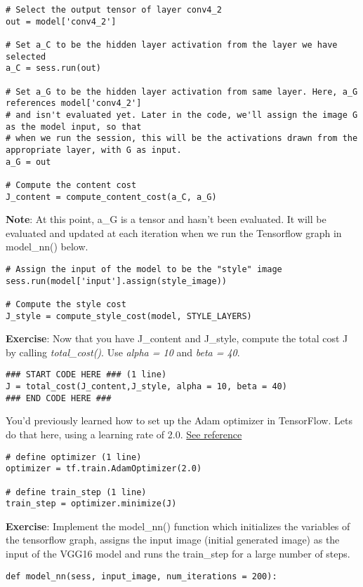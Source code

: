 {\begin{verbatim}
# Select the output tensor of layer conv4_2
out = model['conv4_2']

# Set a_C to be the hidden layer activation from the layer we have selected
a_C = sess.run(out)

# Set a_G to be the hidden layer activation from same layer. Here, a_G references model['conv4_2'] 
# and isn't evaluated yet. Later in the code, we'll assign the image G as the model input, so that
# when we run the session, this will be the activations drawn from the appropriate layer, with G as input.
a_G = out

# Compute the content cost
J_content = compute_content_cost(a_C, a_G)
\end{verbatim}


{\textbf{Note}}: At this point, a\_G is a tensor and hasn't been evaluated. It will be evaluated and updated at each iteration when we run the Tensorflow graph in model\_nn() below.
\begin{verbatim}
# Assign the input of the model to be the "style" image 
sess.run(model['input'].assign(style_image))

# Compute the style cost
J_style = compute_style_cost(model, STYLE_LAYERS)
\end{verbatim}


{\textbf{Exercise}}: Now that you have J\_content and J\_style, compute the total cost J by calling \emph{total\_cost()}. Use \emph{alpha = 10} and \emph{beta = 40}.
\begin{verbatim}
### START CODE HERE ### (1 line)
J = total_cost(J_content,J_style, alpha = 10, beta = 40)
### END CODE HERE ###
\end{verbatim}


You'd previously learned how to set up the Adam optimizer in TensorFlow. Lets do that here, using a learning rate of 2.0.  \href{https://www.tensorflow.org/api_docs/python/tf/train/AdamOptimizer}{See reference}
\begin{verbatim}
# define optimizer (1 line)
optimizer = tf.train.AdamOptimizer(2.0)

# define train_step (1 line)
train_step = optimizer.minimize(J)
\end{verbatim}


{\textbf{Exercise}}: Implement the model\_nn() function which initializes the variables of the tensorflow graph, assigns the input image (initial generated image) as the input of the VGG16 model and runs the train\_step for a large number of steps.
\begin{verbatim}
def model_nn(sess, input_image, num_iterations = 200):
    

\end{verbatim}}
